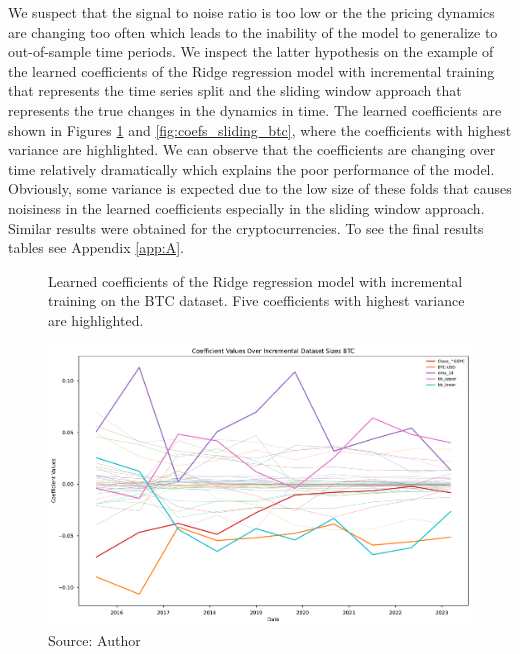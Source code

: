 We suspect that the signal to noise ratio is too low
or the the pricing dynamics are changing too often 
which leads to the inability of the model to generalize
to out-of-sample time periods. We inspect the latter hypothesis
on the example of the learned coefficients of the Ridge regression model
with incremental training that represents
the time series split and the sliding window approach that represents
the true changes in the dynamics in time.
The learned coefficients are shown 
in Figures \ref{fig:coefs_incremental_btc} and \ref{fig:coefs_sliding_btc},
where the coefficients with highest variance are highlighted.
We can observe that the coefficients are changing over time relatively
dramatically which explains the poor performance of the model. Obviously,
some variance is expected due to the low size of these folds
that causes noisiness in the learned coefficients especially in the sliding
window approach. Similar results were obtained for the cryptocurrencies.
To see the final results tables see Appendix \ref{app:A}.


\begin{figure}[!h]
    \centering
    \caption{Learned coefficients of the Ridge regression model
    with incremental training on the BTC dataset. Five 
    coefficients with highest variance are highlighted.}
    \includegraphics[width=1\textwidth]{Figures/coefficient_values_incremental_btc.pdf}
    \caption*{Source: Author}
    \label{fig:coefs_incremental_btc}
\end{figure}

